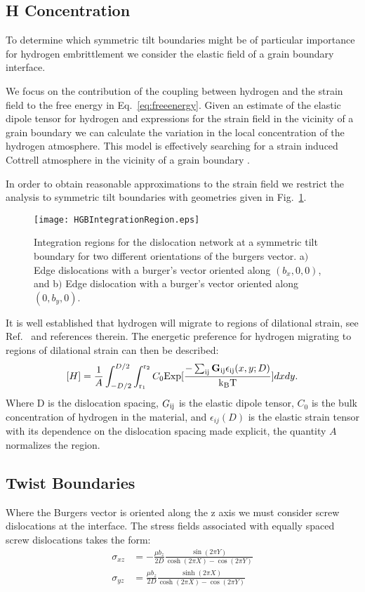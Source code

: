 \documentclass{article}
\def\G{{\bf G}}
\begin{document}
\subsection{H Concentration}
To determine which symmetric tilt boundaries might be of particular importance
for hydrogen embrittlement we consider the elastic field of a grain boundary
interface.

We focus on the contribution of the coupling between hydrogen and the strain field 
to the free energy in Eq.~\ref{eq:freeenergy}. Given an estimate of the elastic
dipole tensor for hydrogen and expressions for the strain field in the vicinity of a grain boundary
we can calculate the variation in the local concentration of the hydrogen atmosphere. This model
is effectively searching for a strain induced Cottrell atmosphere in the vicinity of 
a grain boundary \cite{cottrell49, louat56}.

In order to obtain reasonable approximations to the strain  
field we restrict the analysis to symmetric tilt boundaries
with geometries given in Fig.~\ref{fig:symmtilt}.
%
\begin{figure}[!tbp]
\begin{center}
\texttt{[image: HGBIntegrationRegion.eps]}
\caption{Integration regions for the dislocation network at a symmetric tilt boundary for two different
orientations of the burgers vector. a$)$ Edge dislocations with a burger's vector oriented along 
$(b_x,0,0)$, and b$)$ Edge dislocation with a burger's vector oriented along $(0,b_y,0)$.\label{fig:symmtilt}}
\end{center}
\end{figure}
%
It is well established that hydrogen will migrate to regions of dilational strain,
see Ref.~\cite{ramasubramaniam09} and references therein. The energetic preference
for hydrogen migrating to regions of dilational strain can then be described:\cite{}
%
\begin{equation}
\label{eq:hdistrib}
[H] = \frac{1}{A}\int_{-D/2}^{D/2}\int_{\rm r_{1}}^{\rm r_{2}}C_{0}{\rm Exp}[{\frac{-\sum_{\rm ij}\G_{\rm ij}\epsilon_{\rm ij}(x,y;D)}{{\rm k_{B}T}}}]dxdy.
\end{equation}
%
Where D is the dislocation spacing, $G_{\rm ij}$ is the elastic dipole tensor, $C_{0}$
is the bulk concentration of hydrogen in the material, and $\epsilon_{ij}(D)$ 
is the elastic strain tensor with its dependence on 
the dislocation spacing made explicit, the quantity $A$ normalizes the region. 
%
\subsection{Twist Boundaries}
Where the Burgers vector is oriented along the z axis we must consider screw dislocations
at the interface. The stress fields associated with equally spaced screw dislocations
takes the form:
%
\begin{align*}
\sigma_{xz} &= -\frac{\mu b_{z}}{2D} \frac{\sin(2\pi Y)}{\cosh(2\pi X) - \cos(2\pi Y)}\\
\sigma_{yz} &=  \frac{\mu b_{z}}{2D} \frac{\sinh(2\pi X)}{\cosh(2\pi X) - \cos(2\pi Y)}
\end{align*}
\end{document}
